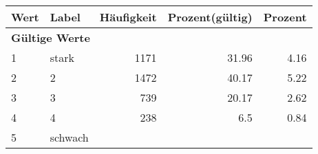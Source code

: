      \begin{longtable}{lXrrr}
     \toprule
     \textbf{Wert} & \textbf{Label} & \textbf{Häufigkeit} & \textbf{Prozent(gültig)} & \textbf{Prozent} \\
     \endhead
     \midrule
     \multicolumn{5}{l}{\textbf{Gültige Werte}}\\

     1 &
     \multicolumn{1}{X}{ stark   } &


       \num{1171} &
       \num[round-mode=places,round-precision=2]{31,96} &
         \num[round-mode=places,round-precision=2]{4,16} \\

     2 &
     \multicolumn{1}{X}{ 2   } &


       \num{1472} &
       \num[round-mode=places,round-precision=2]{40,17} &
         \num[round-mode=places,round-precision=2]{5,22} \\

     3 &
     \multicolumn{1}{X}{ 3   } &


       \num{739} &
       \num[round-mode=places,round-precision=2]{20,17} &
         \num[round-mode=places,round-precision=2]{2,62} \\

     4 &
     \multicolumn{1}{X}{ 4   } &


       \num{238} &
       \num[round-mode=places,round-precision=2]{6,5} &
         \num[round-mode=places,round-precision=2]{0,84} \\

     5 &
     \multicolumn{1}{X}{ schwach   } &



\end{longtable}
